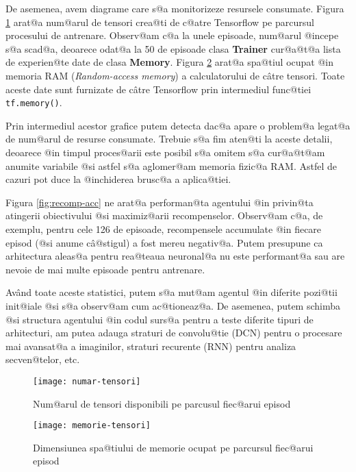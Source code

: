 
De asemenea, avem diagrame care s@a monitorizeze resursele consumate. Figura \ref{fig:numar-tensori} arat@a num@arul de tensori crea@ti de c@atre Tensorflow pe parcursul procesului de antrenare. Observ@am c@a la unele episoade, num@arul @incepe s@a scad@a, deoarece odat@a la 50 de episoade clasa \textbf{Trainer} cur@a@t@a lista de experien@te date de clasa \textbf{Memory}. Figura \ref{fig:memorie-tensori} arat@a spa@tiul ocupat @in memoria RAM (\textsl{Random-access memory}) a calculatorului de c\^ atre tensori. Toate aceste date sunt furnizate de c\^ atre Tensorflow prin intermediul func@tiei \texttt{tf.memory()}.  

Prin intermediul acestor grafice putem detecta dac@a apare o problem@a legat@a de num@arul de resurse consumate. Trebuie s@a fim aten@ti la aceste detalii, deoarece @in timpul proces@arii este posibil s@a omitem s@a cur@a@t@am anumite variabile @si astfel s@a aglomer@am memoria fizic@a RAM. Astfel de cazuri pot duce la @inchiderea brusc@a a aplica@tiei.

Figura \ref{fig:recomp-acc} ne arat@a performan@ta agentului @in privin@ta atingerii obiectivului @si maximiz@arii recompenselor. Observ@am c@a, de exemplu, pentru cele 126 de episoade, recompensele accumulate @in fiecare episod (@si anume c\^ a@stigul) a fost mereu ne\-ga\-ti\-v@a. Putem presupune ca arhitectura aleas@a pentru rea@teaua neuronal@a nu este performant@a sau are nevoie de mai multe episoade pentru antrenare.

Av\^and toate aceste statistici, putem s@a mut@am agentul @in diferite pozi@tii init@iale @si s@a observ@am cum ac@tioneaz@a. De asemenea, putem schimba @si structura agentului @in codul surs@a pentru a teste diferite tipuri de arhitecturi, am putea adauga straturi de convolu@tie (DCN) pentru o procesare mai avansat@a a imaginilor, straturi recurente (RNN) pentru analiza secven@telor, etc.



\begin{figure}[h]
	\centering
	\texttt{[image: numar-tensori]}
	\caption{Num@arul de tensori disponibili pe parcusul fiec@arui episod}
	\label{fig:numar-tensori}
\end{figure}


\begin{figure}[h]
	\centering
	\texttt{[image: memorie-tensori]}
	\caption{Dimensiunea spa@tiului de memorie ocupat pe parcursul fiec@arui episod}
	\label{fig:memorie-tensori}
\end{figure}


